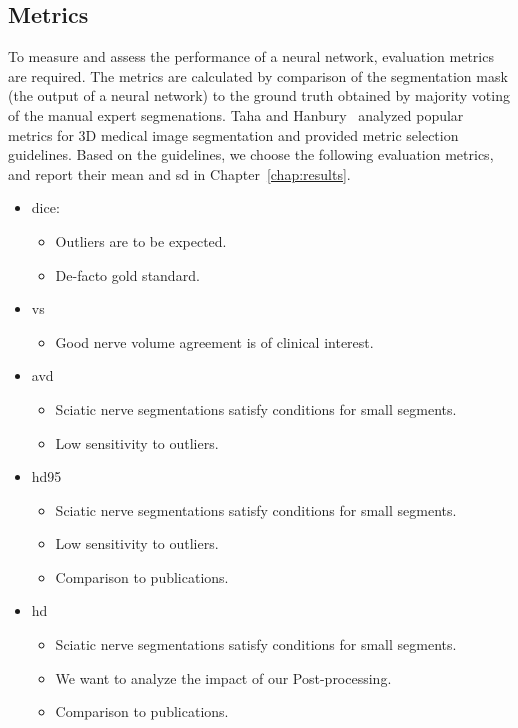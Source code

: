 \subsection{Metrics} \label{sec:eval_metrics}
To measure and assess the performance of a neural network, evaluation metrics are required. The metrics are calculated by comparison of the segmentation mask (the output of a neural network) to the ground truth obtained by majority voting of the manual expert segmenations. Taha and Hanbury~\cite{Taha2015MetricsTool} analyzed popular metrics for 3D medical image segmentation and provided metric selection guidelines. Based on the guidelines, we choose the following evaluation metrics, and report their mean and \gls{sd} in Chapter~\ref{chap:results}.

\begin{itemize}
\item \glsdesc{dice}:
  \begin{itemize}
  \item Outliers are to be expected.
  \item De-facto gold standard.
  \end{itemize}
\item \glsdesc{vs}
  \begin{itemize}
  \item Good nerve volume agreement is of clinical interest.
  \end{itemize}
\item \glsdesc{avd}
  \begin{itemize}
  \item Sciatic nerve segmentations satisfy conditions for small segments.
  \item Low sensitivity to outliers.
  \end{itemize}
\item \glsdesc{hd95}
  \begin{itemize}
  \item Sciatic nerve segmentations satisfy conditions for small segments.
  \item Low sensitivity to outliers.
  \item Comparison to publications.
  \end{itemize}
\item \glsdesc{hd}
  \begin{itemize}
  \item Sciatic nerve segmentations satisfy conditions for small segments.
  \item We want to analyze the impact of our Post-processing.
  \item Comparison to publications.
  \end{itemize}
\end{itemize}

